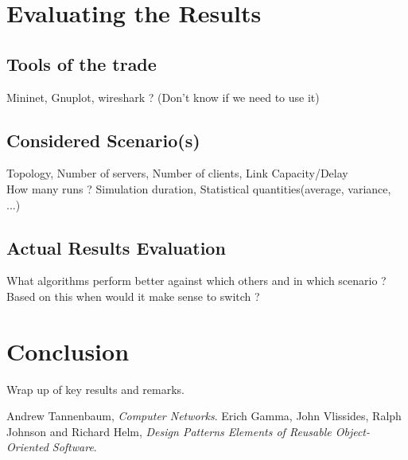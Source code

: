 \documentclass[type=bsc,accentcolor=tud9a,colorback,11pt,paper=a4report]{tudthesis}
\begin{document}
\chapter{Evaluating the Results}
	\section{Tools of the trade}
	Mininet, Gnuplot, wireshark ? (Don't know if we need to use it)\\
	\section{Considered Scenario(s)}
	Topology, Number of servers, Number of clients, Link Capacity/Delay\\
	How many runs ? Simulation duration, Statistical quantities(average, variance, ...)
	\section{Actual Results Evaluation}
	What algorithms perform better against which others and in which scenario ?\\
	Based on this when would it make sense to switch ?
\chapter{Conclusion}
	Wrap up of key results and remarks.
\begin{thebibliography}{1}
	 Andrew Tannenbaum, \emph{Computer Networks}.
	 Erich Gamma, John Vlissides, Ralph Johnson and Richard Helm, \emph{Design Patterns Elements of Reusable Object-Oriented Software}.
\end{thebibliography}
\end{document}
